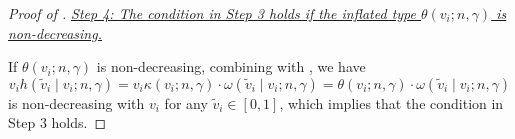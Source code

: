 \begin{proof}[{Proof of }]
\medskip 

\noindent\textit{\underline{Step 4: The condition in Step 3 holds if the inflated type
$\theta\left(v_i; n, \gamma\right)$ is non-decreasing.}}

 \medskip

\noindent If $\theta\left(v_i; n, \gamma\right)$ is non-decreasing, combining with , we have $$v_ih(\tilde{v}_i\mid {v}_i;n, \gamma) = v_i\kappa(v_i;n,\gamma)
 \cdot \omega\left(\tilde{v}_i\mid v_i; n, \gamma\right)= \theta\left(v_i; n, \gamma\right)\cdot \omega\left(\tilde{v}_i\mid v_i; n, \gamma\right)$$
is non-decreasing with $v_i$ for any $\tilde{v}_i \in [0,1]$, which implies that the condition in Step 3 holds.
\end{proof}



